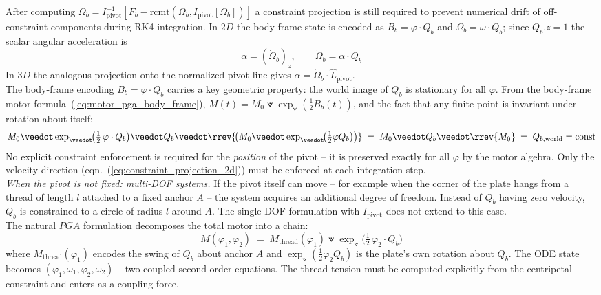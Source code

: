 After computing $\dot{\Omega}_b = I_\text{pivot}^{-1}[F_b - \mathrm{rcmt}(\Omega_b,
I_\text{pivot}[\Omega_b])]$ a constraint projection is still required to prevent numerical
drift of off-constraint components during RK4 integration.
In $2D$ the body-frame state is encoded as $B_b = \varphi \cdot Q_b$
and $\Omega_b = \omega \cdot Q_b$; since $Q_b.z = 1$ the scalar angular acceleration is
\begin{equation}
    \alpha = (\dot{\Omega}_b)_z, \qquad \dot{\Omega}_b = \alpha \cdot Q_b
    \label{eq:constraint_projection_2d}
\end{equation}
In $3D$ the analogous projection onto the normalized pivot line gives $\alpha =
\dot{\Omega}_b \cdot \hat{L}_\text{pivot}$. \\

The body-frame encoding $B_b = \varphi \cdot Q_b$ carries a key geometric property: the
world image of $Q_b$ is stationary for all $\varphi$. From the body-frame motor
formula~(\ref{eq:motor_pga_body_frame}), $M(t) = M_0 \veedot \exp_\veedot(\frac{1}{2}
B_b(t))$, and the fact that any finite point is invariant under rotation about itself:
\begin{equation}
    M_0 \veedot \exp_\veedot\!\bigl(\tfrac{1}{2}\,\varphi \cdot Q_b\bigr)
    \veedot Q_b \veedot
    \rrev{\!\bigl(M_0 \veedot \exp_\veedot\!\bigl(\tfrac{1}{2}\varphi Q_b\bigr)\bigr)}
    \;=\; M_0 \veedot Q_b \veedot \rrev{M_0} \;=\; Q_{b,\text{world}} = \text{const}
    \label{eq:pivot_invariance}
\end{equation}
No explicit constraint enforcement is required for the \emph{position} of the pivot -- it
is preserved exactly for all $\varphi$ by the motor algebra. Only the velocity direction
(eqn.~(\ref{eq:constraint_projection_2d})) must be enforced at each integration step. \\

\emph{When the pivot is not fixed: multi-DOF systems.}
If the pivot itself can move -- for example when the corner of the plate hangs from a
thread of length $l$ attached to a fixed anchor $A$ -- the system acquires an additional
degree of freedom. Instead of $Q_b$ having zero velocity, $Q_b$ is constrained to a
circle of radius $l$ around $A$. The single-DOF formulation with $I_\text{pivot}$ does
not extend to this case. \\

The natural $PGA$ formulation decomposes the total motor into a chain:
\begin{equation}
    M(\varphi_1, \varphi_2) \;=\; M_\text{thread}(\varphi_1) \veedot
    \exp_\veedot\!\bigl(\tfrac{1}{2}\,\varphi_2 \cdot Q_b\bigr)
    \label{eq:motor_multibody_2dof}
\end{equation}
where $M_\text{thread}(\varphi_1)$ encodes the swing of $Q_b$ about anchor $A$ and
$\exp_\veedot(\frac{1}{2}\varphi_2 Q_b)$ is the plate's own rotation about $Q_b$.
The ODE state becomes $(\varphi_1, \omega_1, \varphi_2, \omega_2)$ -- two coupled
second-order equations. The thread tension must be computed explicitly from the centripetal
constraint and enters as a coupling force. \\

